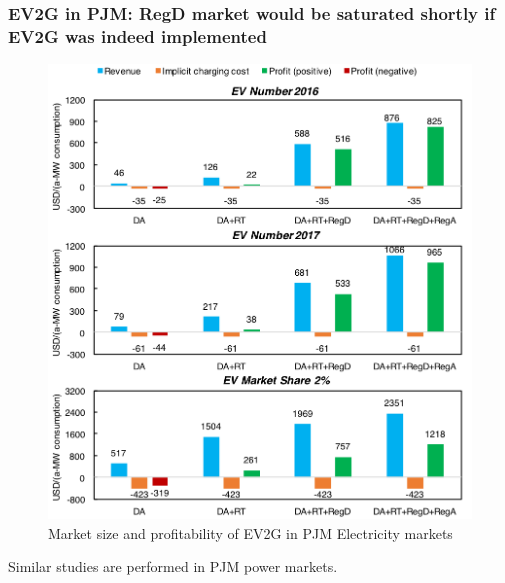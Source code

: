 \subsubsection{EV2G in PJM: RegD market would be saturated shortly if EV2G was indeed implemented}

\begin{figure}[h!]
	\centering
	\includegraphics[width=0.95\linewidth]{Figures/PJM_EV_profit}
	\caption{Market size and profitability of EV2G in PJM Electricity markets}
	\label{fig:PJM_EV}
\end{figure}

Similar studies are performed in PJM power markets. %

